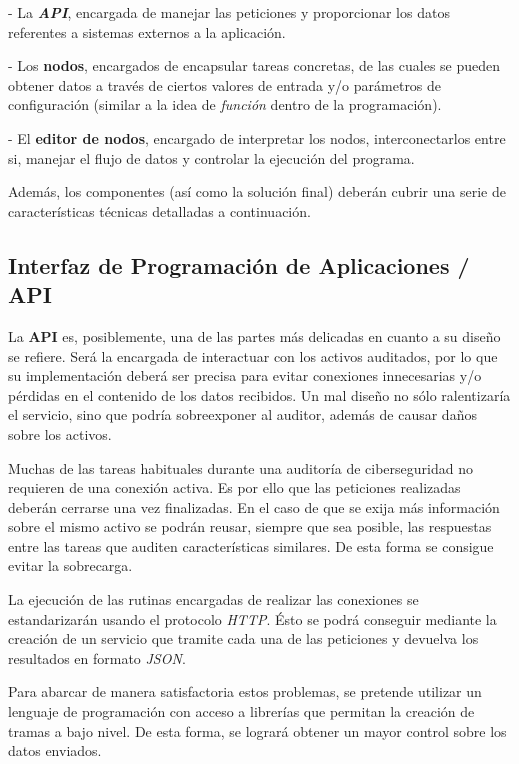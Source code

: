 - La \textbf{\textit{API}}, encargada de manejar las peticiones y proporcionar los datos referentes a sistemas externos a la aplicación.\sn

- Los \textbf{nodos}, encargados de encapsular tareas concretas, de las cuales se pueden obtener datos a través de ciertos valores de entrada y/o parámetros de configuración (similar a la idea de \textit{función} dentro de la programación).\sn

- El \textbf{editor de nodos}, encargado de interpretar los nodos, interconectarlos entre si, manejar el flujo de datos y controlar la ejecución del programa.\n

Además, los componentes (así como la solución final) deberán cubrir una serie de características técnicas detalladas a continuación.

\subsection{Interfaz de Programación de Aplicaciones / API} \label{sub:api}

La \textbf{API} es, posiblemente, una de las partes más delicadas en cuanto a su diseño se refiere. Será la encargada de interactuar con los activos auditados, por lo que su implementación deberá ser precisa para evitar conexiones innecesarias y/o pérdidas en el contenido de los datos recibidos. Un mal diseño no sólo ralentizaría el servicio, sino que podría sobreexponer al auditor, además de causar daños sobre los activos.\sn

Muchas de las tareas habituales durante una auditoría de ciberseguridad no requieren de una conexión activa. Es por ello que las peticiones realizadas deberán cerrarse una vez finalizadas. En el caso de que se exija más información sobre el mismo activo se podrán reusar, siempre que sea posible, las respuestas entre las tareas que auditen características similares. De esta forma se consigue evitar la sobrecarga.\sn

La ejecución de las rutinas encargadas de realizar las conexiones se estandarizarán usando el protocolo \textit{HTTP}. Ésto se podrá conseguir mediante la creación de un servicio que tramite cada una de las peticiones y devuelva los resultados en formato \textit{JSON}.\sn

Para abarcar de manera satisfactoria estos problemas, se pretende utilizar un lenguaje de programación con acceso a librerías que permitan la creación de tramas a bajo nivel. De esta forma, se logrará obtener un mayor control sobre los datos enviados.\sn

